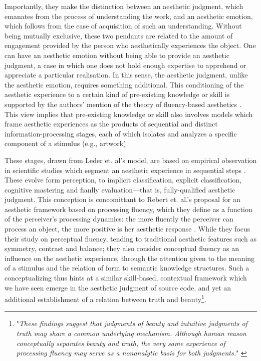Importantly, they make the distinction between an aesthetic judgment, which emanates from the process of understanding the work, and an aesthetic emotion, which follows from the ease of acquisition of such an understanding. Without being mutually exclusive, these two pendants are related to the amount of engagement provided by the person who aesthetically experiences the object. One can have an aesthetic emotion without being able to provide an aesthetic judgment, a case in which one does not hold enough expertise to apprehend or appreciate a particular realisation. In this sense, the aesthetic judgment, unlike the aesthetic emotion, requires something additional. This conditioning of the aesthetic experience to a certain kind of pre-existing knowledge or skill is supported by the authors' mention of the theory of fluency-based aesthetics \citep{chatterjee_neuroscience_2016}. This view implies that pre-existing knowledge or skill also involves models which frame aesthetic experiences as the products of sequential and distinct information-processing stages, each of which isolates and analyzes a specific component of a stimulus (e.g., artwork).

These stages, drawn from Leder et. al's model, are based on empirical observation in scientific studies which segment an aesthetic experience in sequential steps \citep{leder_model_2004}. These evolve form perception, to implicit classification, explicit classification, cognitive mastering and fianlly evaluation—that is, fully-qualified aesthetic judgment. This conception is concomittant to Rebert et. al.'s proposal for an aesthetic framework based on processing fluency, which they define as a function of the perceiver's processing dynamics: the more fluently the perceiver can process an object, the more positive is her aesthetic response \citep{reber_processing_2004}. While they focus their study on perceptual fluency, tending to traditional aesthetic features such as symmetry, contrast and balance; they also consider conceptual fluency as an influence on the aesthetic experience, through the attention given to the meaning of a stimulus and the relation of form to semantic knowledge structures. Such a conceptualizing thus hints at a similar skill-based, contextual framework which we have seen emerge in the aesthetic judgment of source code, and yet an additional establishment of a relation between truth and beauty\footnote{"\emph{These findings suggest that judgments of beauty and intuitive judgments of truth may share a common underlying mechanism. Although human reason conceptually separates beauty and truth, the very same experience of processing fluency may serve as a nonanalytic basis for both judgments.}" \citep{reber_processing_2004}}.

